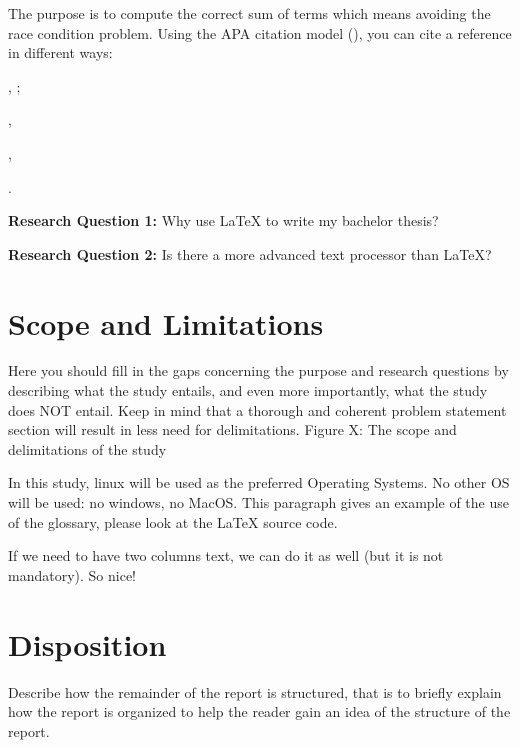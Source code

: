 \documentclass[a4paper, 12pt]{report}
\begin{document}
\medskip
The purpose is to compute the correct sum of terms which means avoiding the race condition problem. Using the APA citation model (\cite{apaju2024}), you can cite a reference in different ways:

\citeauthor{flanagan2001}, \citeyear{flanagan2001};

\autocite[compare to][3]{flanagan2001},

\parencite{flanagan2001},

\textcite[5]{flanagan2001}.



\bigskip %
\textbf{Research Question 1:} Why use LaTeX to write my bachelor thesis?

\medskip %
\textbf{Research Question 2:} Is there a more advanced text processor than LaTeX?
 

\section{Scope and Limitations}

\textcolor{jupurple}{
Here you should fill in the gaps concerning the purpose and research questions by describing what the study entails, and even more importantly, what the study does NOT entail. Keep in mind that a thorough and coherent problem statement section will result in less need for delimitations. 
Figure X: The scope and delimitations of the study
}

\medskip
In this study, \gls{linux} will be used as the preferred Operating Systems. No other OS will be used: no \gls{windows}, no MacOS. This paragraph gives an example of the use of the glossary, please look at the LaTeX source code.

If we need to have two columns text, we can do it as well (but it is not mandatory). So nice!

\begin{multicols}{2}
  \lipsum[1]

  \lipsum[1]

  \lipsum[1]
\end{multicols}


\section{Disposition}

\textcolor{jupurple}{
Describe how the remainder of the report is structured, that is to briefly explain how the report is organized to help the reader gain an idea of the structure of the report.
}
\end{document}
